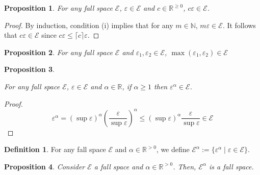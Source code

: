 \documentclass{article}
\numberwithin{equation}{section}
\theoremstyle{definition}
\newtheorem{definition}{Definition}[section]
\theoremstyle{plain}
\newtheorem{proposition}{Proposition}[section]
\newcommand{\Nats}{\mathbb{N}}
\newcommand{\Reals}{\mathbb{R}}
\newcommand{\Ceil}[1]{\lceil #1 \rceil}
\newcommand{\Fall}{\mathcal{E}}
\begin{document}
\begin{proposition}

For any fall space $\Fall$, $\varepsilon \in \Fall$ and $c \in \Reals^{\geq 0}$, $c \varepsilon \in \Fall$.

\end{proposition}

\begin{proof}

By induction, condition (i) implies that for any $m \in \Nats$, $m\varepsilon \in \Fall$. It follows that $c\varepsilon \in \Fall$ since $c\varepsilon \leq \Ceil{c}\varepsilon$.
\end{proof}

\begin{proposition}

For any fall space $\Fall$ and $\varepsilon_1, \varepsilon_2 \in \Fall$, $\max(\varepsilon_1,\varepsilon_2) \in \Fall$

\end{proposition}


\begin{proposition}
\label{prp:fall_space_closed_wrt_power}

For any fall space $\Fall$, $\varepsilon \in \Fall$ and $\alpha \in \Reals$, if $\alpha \geq 1$ then $\varepsilon^\alpha \in \Fall$.

\end{proposition}

\begin{proof}

$$\varepsilon^\alpha = (\sup \varepsilon)^\alpha (\frac{\varepsilon}{\sup \varepsilon})^\alpha \leq  (\sup \varepsilon)^\alpha \frac{\varepsilon}{\sup \varepsilon} \in \Fall$$
\end{proof}

\begin{samepage}
\begin{definition}

For any fall space $\Fall$ and $\alpha \in \Reals^{>0}$, we define ${\Fall^\alpha := \{\varepsilon^\alpha \mid \varepsilon \in \Fall\}}$.

\end{definition}
\end{samepage}

\begin{proposition}

Consider $\Fall$ a fall space and $\alpha \in \Reals^{>0}$. Then, $\Fall^\alpha$ is a fall space.

\end{proposition}
\end{document}
